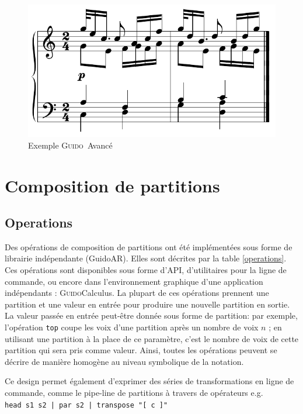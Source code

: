 \documentclass{article}
\newcommand{\Guido}		{\textsc{Guido}}
\newcommand{\GAR}			{GuidoAR}
\newcommand{\code}[1]		{{\small \texttt{#1}}}
\begin{document}
\begin{figure}[h]
	\centering \includegraphics[width=0.85\columnwidth]{rsrc/4voices}
 \caption{Exemple \Guido\ Avancé}
 \label{advex}
\end{figure}



\section{Composition de partitions}
\subsection{Operations}
Des opérations de composition de partitions ont été implémentées sous forme de librairie indépendante (\GAR ). Elles sont décrites par la table  \ref{operations}. Ces opérations sont disponibles sous forme d'API, d'utilitaires pour la ligne de commande, ou encore dans l'environnement graphique d'une application indépendants : \Guido Calculus.
La plupart de ces opérations prennent une partition et une valeur en entrée pour produire une nouvelle partition en sortie. La valeur passée en entrée peut-être donnée sous forme de partition: par exemple, l'opération  \code{top} coupe les voix d'une partition après un nombre de voix $n$ ; en utilisant une partition à la place de ce paramètre, c'est le nombre de voix de cette partition qui sera pris comme valeur.
Ainsi, toutes les opérations peuvent se décrire de manière homogène au niveau symbolique de la notation. 

Ce design permet également d'exprimer des séries de transformations en ligne de commande, comme le pipe-line de partitions à travers de opérateurs e.g. \\
\hspace*{4mm} \code{head s1 s2 | par s2 | transpose "[ c ]" }
\end{document}
